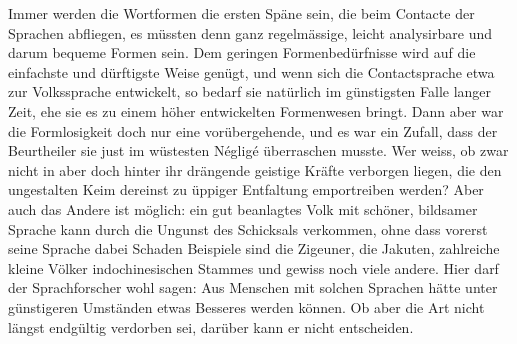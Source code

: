 Immer werden die Wortformen die ersten Späne sein, die beim Contacte der Sprachen abfliegen, es müssten denn ganz regelmässige, leicht analysirbare und darum bequeme Formen sein. Dem geringen Formenbedürfnisse wird auf die einfachste und dürftigste Weise genügt, und wenn sich die Contactsprache etwa zur Volkssprache entwickelt, so bedarf sie natürlich im günstigsten Falle langer Zeit, ehe sie es zu einem höher entwickelten Formenwesen bringt. Dann aber war die Formlosigkeit doch nur eine vorübergehende, und es war ein Zufall, dass der \label{fp.388} Beurtheiler sie just im wüstesten Négligé überraschen musste. Wer weiss, ob zwar nicht in aber doch hinter ihr drängende geistige Kräfte verborgen liegen, die den ungestalten Keim dereinst zu üppiger Entfaltung emportreiben werden? Aber auch das Andere ist möglich: ein gut beanlagtes Volk mit schöner, bildsamer Sprache kann durch die Ungunst des Schicksals verkommen, ohne dass vorerst seine Sprache dabei Schaden  Beispiele sind die Zigeuner, die Jakuten, zahlreiche kleine Völker indochinesischen Stammes und gewiss noch viele andere. Hier darf der Sprachforscher wohl sagen: Aus Menschen mit solchen Sprachen hätte unter günstigeren Umständen etwas Besseres werden können. Ob aber die Art nicht längst endgültig verdorben sei, darüber kann er nicht entscheiden.

